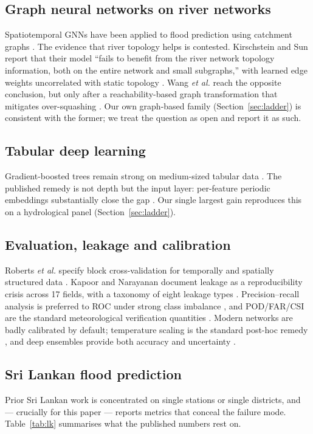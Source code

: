 \documentclass[conference]{IEEEtran}
\begin{document}
\subsection{Graph neural networks on river networks}
Spatiotemporal GNNs have been applied to flood prediction using catchment graphs
\cite{kazadi2024,bentivoglio2025,taghizadeh2025}. The evidence that river
topology helps is contested. Kirschstein and Sun report that their model
``fails to benefit from the river network topology information, both on the
entire network and small subgraphs,'' with learned edge weights uncorrelated with
static topology \cite{kirschstein2024}. Wang \emph{et al.} reach the opposite
conclusion, but only after a reachability-based graph transformation that
mitigates over-squashing \cite{wang2025}. Our own graph-based family
(Section~\ref{sec:ladder}) is consistent with the former; we treat the question
as open and report it as such.

\subsection{Tabular deep learning}
Gradient-boosted trees remain strong on medium-sized tabular data
\cite{grinsztajn2022}. The published remedy is not depth but the input layer:
per-feature periodic embeddings substantially close the gap
\cite{gorishniy2022}. Our single largest gain reproduces this on a hydrological
panel (Section~\ref{sec:ladder}).

\subsection{Evaluation, leakage and calibration}
Roberts \emph{et al.} specify block cross-validation for temporally and spatially
structured data \cite{roberts2017}. Kapoor and Narayanan document leakage as a
reproducibility crisis across 17 fields, with a taxonomy of eight leakage types
\cite{kapoor2023}. Precision--recall analysis is preferred to ROC under strong
class imbalance \cite{davis2006,saito2015}, and POD/FAR/CSI are the standard
meteorological verification quantities \cite{jolliffe2012}. Modern networks are
badly calibrated by default; temperature scaling is the standard post-hoc remedy
\cite{guo2017}, and deep ensembles provide both accuracy and uncertainty
\cite{lakshminarayanan2017}.

\subsection{Sri Lankan flood prediction}
\label{sec:related-lk}
Prior Sri Lankan work is concentrated on single stations or single districts, and
--- crucially for this paper --- reports metrics that conceal the failure mode.
Table~\ref{tab:lk} summarises what the published numbers rest on.
\end{document}
